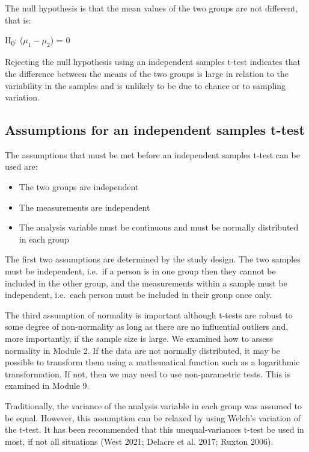 \documentclass[
  a4paper,
]{memoir}
\providecommand{\tightlist}{%
  \setlength{\itemsep}{0pt}\setlength{\parskip}{0pt}}
\begin{document}
The null hypothesis is that the mean values of the two groups are not
different, that is:

H\textsubscript{0}: (\(\mu_1 - \mu_2\)) = 0

Rejecting the null hypothesis using an independent samples t-test
indicates that the difference between the means of the two groups is
large in relation to the variability in the samples and is unlikely to
be due to chance or to sampling variation.

\subsection{Assumptions for an independent samples
t-test}\label{assumptions-for-an-independent-samples-t-test}

The assumptions that must be met before an independent samples t-test
can be used are:

\begin{itemize}
\tightlist
\item
  The two groups are independent
\item
  The measurements are independent
\item
  The analysis variable must be continuous and must be normally
  distributed in each group
\end{itemize}

The first two assumptions are determined by the study design. The two
samples must be independent, i.e.~if a person is in one group then they
cannot be included in the other group, and the measurements within a
sample must be independent, i.e.~each person must be included in their
group once only.

The third assumption of normality is important although t-tests are
robust to some degree of non-normality as long as there are no
influential outliers and, more importantly, if the sample size is large.
We examined how to assess normality in Module 2. If the data are not
normally distributed, it may be possible to transform them using a
mathematical function such as a logarithmic transformation. If not, then
we may need to use non-parametric tests. This is examined in Module 9.

Traditionally, the variance of the analysis variable in each group was
assumed to be equal. However, this assumption can be relaxed by using
Welch's variation of the t-test. It has been recommended that this
unequal-variances t-test be used in most, if not all situations (West
2021; Delacre et al. 2017; Ruxton 2006).
\end{document}
